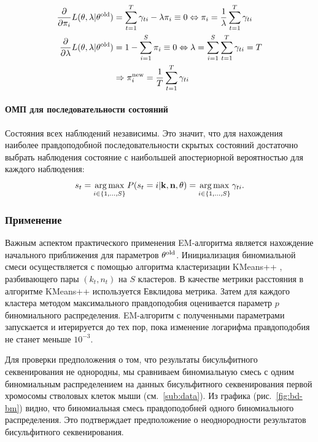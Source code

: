 \begin{align*}
  \frac{\partial}{\partial \pi_i} L(\mathbf{\theta}, \lambda|\mathbf{\theta}^{\operatorname{old}})
  &= \sum\limits_{t = 1}^T \gamma_{ti} - \lambda \pi_i \equiv 0
     \Leftrightarrow \pi_i = \frac{1}{\lambda} \sum\limits_{t = 1}^T \gamma_{ti} \\
  \frac{\partial}{\partial \lambda} L(\mathbf{\theta}, \lambda|\mathbf{\theta}^{\operatorname{old}})
  &= 1 - \sum\limits_{i = 1}^S \pi_i \equiv 0
     \Leftrightarrow \lambda = \sum\limits_{i = 1}^S \sum\limits_{t = 1}^T\gamma_{ti}
     = T \\
  &\Rightarrow \pi_i^{\operatorname{new}} = \frac{1}T\sum\limits_{t = 1}^T \gamma_{ti}
\end{align*}

\paragraph{ОМП для последовательности состояний}

Состояния всех наблюдений независимы. Это значит, что для нахождения наиболее правдоподобной
последовательности скрытых состояний достаточно выбрать наблюдения состояние
с наибольшей апостериорной вероятностью для каждого наблюдения:
$$
s_t
= \operatorname*{arg\,max}\limits_{i \in \{1, \ldots, S\}}
  P(s_t = i|\mathbf{k}, \mathbf{n}, \mathbf{\theta})
= \operatorname*{arg\,max}\limits_{i \in \{1, \ldots, S\}} \gamma_{ti}.
$$

\subsubsection{Применение}
\label{bm:applications}

Важным аспектом практического применения EM-алгоритма является нахождение начального
приближения для параметров $\mathbf{\theta}^{\operatorname{old}}$. Инициализация биномиальной смеси
осуществляется с помощью алгоритма кластеризации KMeans++ \cite[с. 357]{murphy2012machine},
разбивающего пары $(k_t, n_t)$ на $S$ кластеров. В качестве метрики расстояния в алгоритме
KMeans++ используется Евклидова метрика. Затем для каждого кластера методом максимального
правдоподобия оценивается параметр $p$ биномиального распределения. EM-алгоритм
с полученными параметрами запускается и итерируется до тех пор, пока изменение логарифма
правдоподобия не станет меньше $10^{-3}$.

Для проверки предположения о том, что результаты бисульфитного секвенирования не однородны,
мы сравниваем биномиальную смесь с одним биномиальным распределением на данных бисульфитного
секвенирования первой хромосомы стволовых клеток мыши (см.~\ref{sub:data}). Из графика
(рис.~\ref{fig:bd-bm}) видно, что биномиальная смесь правдоподобней одного биномиального
распределения. Это подтверждает предположение о неоднородности результатов бисульфитного
секвенирования.

